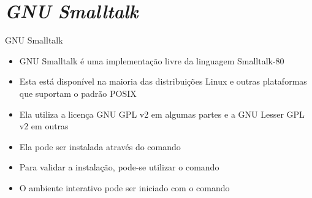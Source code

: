 \section{\it GNU Smalltalk}

\begin{frame}[fragile]{GNU Smalltalk}

    \begin{itemize}
        \item GNU Smalltalk é uma implementação livre da linguagem Smalltalk-80

        \item Esta está disponível na maioria das distribuições Linux e outras plataformas
            que suportam o padrão POSIX

        \item Ela utiliza a licença GNU GPL v2 em algumas partes e a GNU Lesser GPL v2 em outras

        \item Ela pode ser instalada através do comando


        \item Para validar a instalação, pode-se utilizar o comando


        \item O ambiente interativo pode ser iniciado com o comando

    \end{itemize}

\end{frame}

